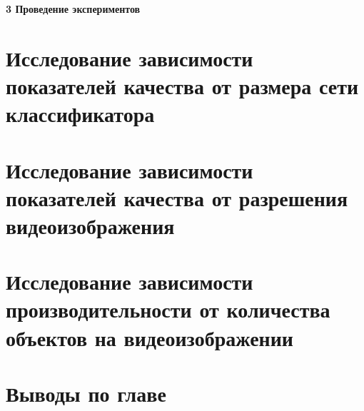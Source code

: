 \newpage
\begin{flushleft}
  \textbf{\large 3 Проведение экспериментов}
\end{flushleft}

\section{Исследование зависимости показателей качества от размера сети классификатора}

\section{Исследование зависимости показателей качества от разрешения видеоизображения}

\section{Исследование зависимости производительности от количества объектов на видеоизображении}

\section{Выводы по главе}
